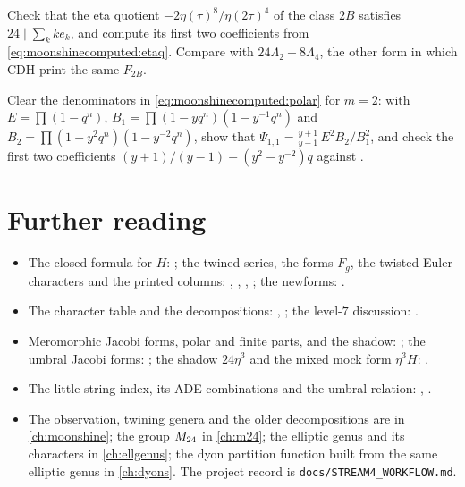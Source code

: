 \begin{exercise}[$\star\star$]\label{exo:moonshinecomputed:etaq}
Check that the eta quotient $-2\eta(\tau)^8/\eta(2\tau)^4$ of the class $2B$
 satisfies $24\mid\sum_kke_k$, and compute its first two
coefficients from \eqref{eq:moonshinecomputed:etaq}. Compare with $24\Lambda_2-8\Lambda_4$,
the other form in which CDH print the same $F_{2B}$.
\end{exercise}

\begin{exercise}[$\star\star\star$]\label{exo:moonshinecomputed:shadow}
Clear the denominators in \eqref{eq:moonshinecomputed:polar} for $m=2$: with
$E=\prod(1-q^n)$, $B_1=\prod(1-yq^n)(1-y^{-1}q^n)$ and $B_2=\prod(1-y^2q^n)(1-y^{-2}q^n)$,
show that $\Psi_{1,1}=\frac{y+1}{y-1}\,E^2B_2/B_1^2$, and check the first two coefficients
$(y+1)/(y-1)-(y^2-y^{-2})q$ against .
\end{exercise}

\section*{Further reading}
\begin{itemize}[leftmargin=*]
\item The closed formula for $H$: ; the
  twined series, the forms $F_g$, the twisted Euler characters and the printed columns:
  , ,
  , ; the
  newforms: .
\item The character table and the decompositions: ,
  ; the level-$7$ discussion: .
\item Meromorphic Jacobi forms, polar and finite parts, and the shadow:
  ; the umbral Jacobi forms: ; the shadow $24\eta^3$ and the mixed mock form $\eta^3H$:
  .
\item The little-string index, its ADE combinations and the umbral relation:
  , .
\item The observation, twining genera and the older decompositions are in
  \cref{ch:moonshine}; the group $M_{24}$ in \cref{ch:m24}; the elliptic genus and its
  characters in \cref{ch:ellgenus}; the dyon partition function built from the same
  elliptic genus in \cref{ch:dyons}. The project record is
  \texttt{docs/STREAM4\_WORKFLOW.md}.
\end{itemize}
